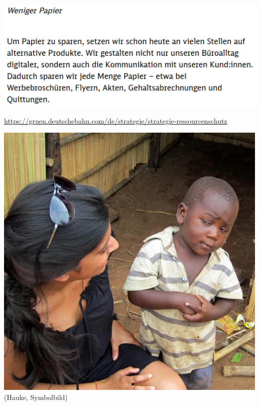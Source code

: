 \documentclass{beamer}
\begin{document}
	\begin{frame}[plain]
		\begin{center}
			\includegraphics[height=0.5\textheight]{images/weniger papier}
		\end{center}
		\vspace{1cm}
		\scriptsize\url{https://gruen.deutschebahn.com/de/strategie/strategie-ressourcenschutz}
	\end{frame}
	
	\begin{frame}[plain]
		\begin{center}
			\includegraphics[height=\textheight]{images/sceptical boy}\\
			\footnotesize(Hauke, Symbolbild)
		\end{center}
	\end{frame}
\end{document}
